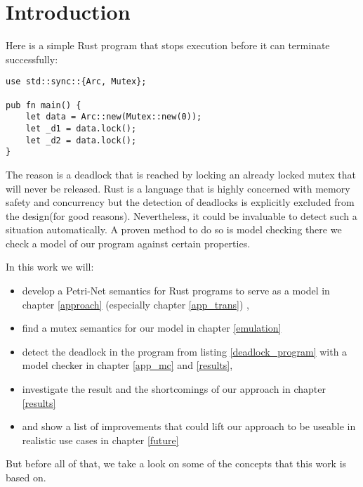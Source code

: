 \chapter{Introduction}
\label{introduction}

Here is a simple Rust\cite{klabnik2018rust} program that stops execution before it can terminate successfully:

\begin{lstlisting}
use std::sync::{Arc, Mutex};

pub fn main() {
    let data = Arc::new(Mutex::new(0));
    let _d1 = data.lock();
    let _d2 = data.lock();
}
\end{lstlisting}
The reason is a deadlock that is reached by locking an already locked mutex that will never be released.
Rust is a language that is highly concerned with memory safety and concurrency\cite{Matsakis:2014:RL:2692956.2663188} but the detection of deadlocks is explicitly excluded from the design\cite[Chapter 8.1]{nomicon}(for good reasons).
Nevertheless, it could be invaluable to detect such a situation automatically.
A proven method to do so is model checking\cite{baier2008principles} there we check a model of our program against certain properties.

In this work we will:
\begin{itemize}
    \item develop a Petri-Net\cite{petri1962kommunikation} semantics for Rust programs to serve as a model in chapter \ref{approach} (especially chapter \ref{app_trans}) ,
    \item find a mutex semantics for our model in chapter \ref{emulation}
    \item detect the deadlock in the program from listing \ref{deadlock_program} with a model checker in chapter \ref{app_mc} and \ref{results},
    \item investigate the result and the shortcomings of our approach in chapter \ref{results}
    \item and show a list of improvements that could lift our approach to be useable in realistic use cases in chapter \ref{future}
\end{itemize}
But before all of that, we take a look on some of the concepts that this work is based on.